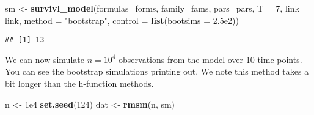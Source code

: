\documentclass[
]{article}
\newenvironment{Shaded}{\begin{snugshade}}{\end{snugshade}}
\newcommand{\AttributeTok}[1]{\textcolor[rgb]{0.13,0.29,0.53}{#1}}
\newcommand{\DecValTok}[1]{\textcolor[rgb]{0.00,0.00,0.81}{#1}}
\newcommand{\FloatTok}[1]{\textcolor[rgb]{0.00,0.00,0.81}{#1}}
\newcommand{\FunctionTok}[1]{\textcolor[rgb]{0.13,0.29,0.53}{\textbf{#1}}}
\newcommand{\NormalTok}[1]{#1}
\newcommand{\OtherTok}[1]{\textcolor[rgb]{0.56,0.35,0.01}{#1}}
\newcommand{\StringTok}[1]{\textcolor[rgb]{0.31,0.60,0.02}{#1}}
\begin{document}
\begin{Shaded}
\begin{Highlighting}[]
\NormalTok{sm }\OtherTok{\textless{}{-}} \FunctionTok{survivl\_model}\NormalTok{(}\AttributeTok{formulas=}\NormalTok{forms, }\AttributeTok{family=}\NormalTok{fams,}
                    \AttributeTok{pars=}\NormalTok{pars, }\AttributeTok{T =} \DecValTok{7}\NormalTok{,}
                    \AttributeTok{link =}\NormalTok{ link, }\AttributeTok{method =} \StringTok{"bootstrap"}\NormalTok{,}
                    \AttributeTok{control =} \FunctionTok{list}\NormalTok{(}\AttributeTok{bootsims =} \FloatTok{2.5e2}\NormalTok{))}
\end{Highlighting}
\end{Shaded}

\begin{verbatim}
## [1] 13
\end{verbatim}

We can now simulate \(n=10^4\) observations from the model over 10 time
points. You can see the bootstrap simulations printing out. We note this
method takes a bit longer than the h-function methods.

\begin{Shaded}
\begin{Highlighting}[]
\NormalTok{n }\OtherTok{\textless{}{-}} \FloatTok{1e4}
\FunctionTok{set.seed}\NormalTok{(}\DecValTok{124}\NormalTok{)}
\NormalTok{dat }\OtherTok{\textless{}{-}} \FunctionTok{rmsm}\NormalTok{(n, sm)}
\end{Highlighting}
\end{Shaded}
\end{document}
